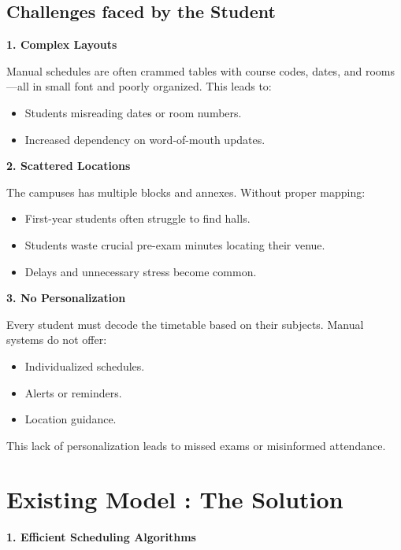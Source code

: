 \documentclass[a4paper,12pt]{article}
\begin{document}
\subsection{Challenges faced by the Student}


\textbf{1. Complex Layouts}

Manual schedules are often crammed tables with course codes, dates, and rooms—all in small font and poorly organized. This leads to:

\begin{itemize}
\item Students misreading dates or room numbers.

\item Increased dependency on word-of-mouth updates.
\end{itemize}

\noindent\textbf{2. Scattered Locations}

The campuses has multiple blocks and annexes. Without proper mapping:
\begin{itemize}
\item First-year students often struggle to find halls.

\item Students waste crucial pre-exam minutes locating their venue.

\item Delays and unnecessary stress become common.
\end{itemize}

\noindent\textbf{3. No Personalization}

Every student must decode the timetable based on their subjects. Manual systems do not offer:

\begin{itemize}   
\item Individualized schedules.

\item Alerts or reminders.

\item Location guidance.
\end{itemize}
This lack of personalization leads to missed exams or misinformed attendance.






\section{Existing Model : The Solution}
\newline
\textbf{1. Efficient Scheduling Algorithms}
\end{document}
